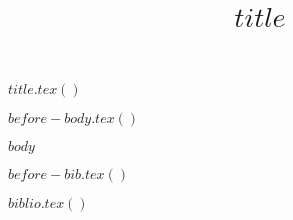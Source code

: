 \documentclass[a4paper,12pt]{article}
\title{$title$}
\date{}
\begin{document}
$title.tex()$

$before-body.tex()$

$body$

$before-bib.tex()$

$biblio.tex()$
\end{document}
